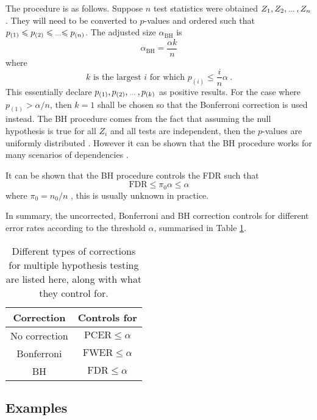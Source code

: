 The procedure is as follows. Suppose $n$ test statistics were obtained $Z_1,Z_2,\dotdotdot,Z_n$. They will need to be converted to $p$-values and ordered such that $p_{(1)}\leqslant p_{(2)}\leqslant \dotdotdot \leqslant p_{(n)}$. The adjusted size $\alpha_{\text{BH}}$ is
\begin{equation}
    \alpha_{\text{BH}} = \frac{\alpha k}{n}
\end{equation}
where
\begin{equation}
    k\text{ is the largest }i\text{ for which }p_{(i)}\leqslant\frac{i}{n}\alpha
    \ .
\end{equation}
This essentially declare $p_{(1)},p_{(2)},\dotdotdot,p_{(k)}$ as positive results. For the case where $p_{(1)}>\alpha/n$, then $k=1$ shall be chosen so that the Bonferroni correction is used instead. The BH procedure comes from the fact that assuming the null hypothesis is true for all $Z_i$ and all tests are independent, then the $p$-values are uniformly distributed \citep{simes1986improved}. However it can be shown that the BH procedure works for many scenarios of dependencies \citep{benjamini2001control}. 

It can be shown that the BH procedure controls the FDR such that
\begin{equation}
    \text{FDR}\leqslant\pi_0\alpha\leqslant\alpha
\end{equation}
where $\pi_0=n_0/n$ \citep{benjamini1995controlling}, this is usually unknown in practice.

In summary, the uncorrected, Bonferroni and BH correction controls for different error rates according to the threshold $\alpha$, summarised in Table \ref{table:inference_corrections}.

\begin{table}
    \centering
    \begin{tabular}{c|c}
        Correction&Controls for\\\hline
        No correction&$\text{PCER}\leqslant\alpha$\\
        Bonferroni&$\text{FWER}\leqslant\alpha$\\
        BH&$\text{FDR}\leqslant\alpha$
    \end{tabular}
    \caption{Different types of corrections for multiple hypothesis testing are listed here, along with what they control for.}
    \label{table:inference_corrections}
\end{table}

\subsection{Examples}

